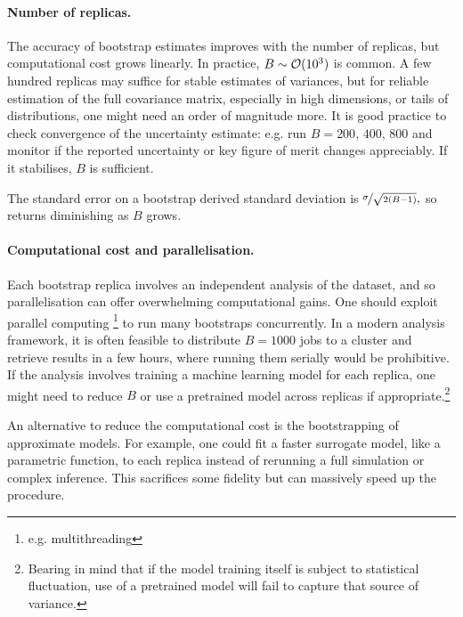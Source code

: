         \paragraph{Number of replicas.}
            The accuracy of bootstrap estimates improves with the number of replicas, but computational cost grows linearly.
            In practice, $B\sim{\mathcal O}(\num{d3})$ is common.
            A few hundred replicas may suffice for stable estimates of variances, but for reliable estimation of the full covariance matrix, especially in high dimensions, or tails of distributions, one might need an order of magnitude more.
            It is good practice to check convergence of the uncertainty estimate: e.g. run $B=200$, $400$, $800$ and monitor if the reported uncertainty or key figure of merit changes appreciably.
            If it stabilises, $B$ is sufficient.
            
            The standard error on a bootstrap derived standard deviation is $\nicefrac{\sigma}{\sqrt{2(B-1)}},$ so returns diminishing as $B$ grows.
        \paragraph{Computational cost and parallelisation.}
            Each bootstrap replica involves an independent analysis of the dataset, and so parallelisation can offer overwhelming computational gains.
            One should exploit parallel computing \footnote{e.g. multithreading} to run many bootstraps concurrently.
            In a modern analysis framework, it is often feasible to distribute $B=1000$ jobs to a cluster and retrieve results in a few hours, where running them serially would be prohibitive.
            If the analysis involves training a machine learning model for each replica, one might need to reduce $B$ or use a pretrained model across replicas if appropriate.\footnote{Bearing in mind that if the model training itself is subject to statistical fluctuation, use of a pretrained model will fail to capture that source of variance.}
            
            An alternative to reduce the computational cost is the bootstrapping of approximate models.
            For example, one could fit a faster surrogate model, like a parametric function, to each replica instead of rerunning a full simulation or complex inference.
            This sacrifices some fidelity but can massively speed up the procedure.

